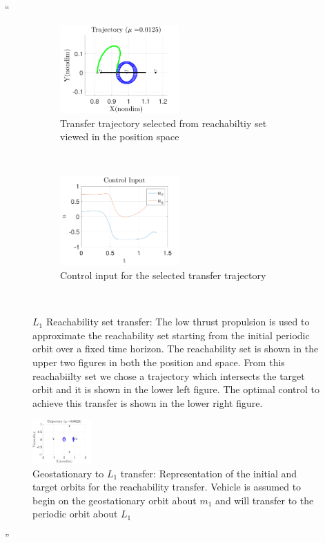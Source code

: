 \documentclass[11pt]{article}
\newenvironment{correction}{\begin{list}{}{\setlength{\leftmargin}{1cm}\setlength{\rightmargin}{1cm}}\vspace{\parsep}\item[]``}{''\end{list}}
\begin{document}
\begin{enumerate}
\begin{correction}
\begin{figure}[H]
        \begin{subfigure}[htbp]{0.5\textwidth} 
                \includegraphics[width=0.5\textwidth]{reach_transfer} 
                \caption{Transfer trajectory selected from reachabiltiy set viewed in the position space}  
        \end{subfigure}~ 
        \begin{subfigure}[htbp]{0.5\textwidth} 
                \includegraphics[width=0.5\textwidth]{control_input_l1} 
                \caption{Control input for the selected transfer trajectory}  
        \end{subfigure}~
        \caption{\( L_1 \) Reachability set transfer: The low thrust propulsion is used to approximate the reachability set starting from the initial periodic orbit over a fixed time horizon.
        The reachability set is shown in the upper two figures in both the position and \Poincare space.
    From this reachabiilty set we chose a trajectory which intersects the target orbit and it is shown in the lower left figure.
The optimal control to achieve this transfer is shown in the lower right figure.} 
\end{figure}

\begin{figure}[H]
   \centering
   \includegraphics[width=0.2\textwidth]{initial_final} %
   \caption{Geostationary to \( L_1 \) transfer: Representation of the initial and target orbits for the reachability transfer. 
   Vehicle is assumed to begin on the geostationary orbit about \( m_1\) and will transfer to the periodic orbit about \( L_1\)}
\end{figure}


\end{correction}
\end{enumerate}
\end{document}
